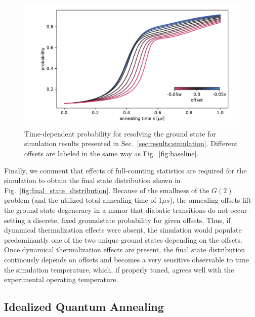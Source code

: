 \documentclass[10pt]{iopart}
\begin{document}
\begin{figure}
	\centering
	\includegraphics[width=\columnwidth]{./new_figures/time_dependent_probability.pdf}
	\caption{Time-dependent probability for resolving the ground state for simulation results presented in Sec.~\ref{sec:results:simulation}. Different offsets are labeled in the same way as Fig.~\ref{fig:baseline}.}
	\label{fig:td_prob}
\end{figure}

Finally, we comment that effects of full-counting statistics are required for the simulation to obtain the final state distribution shown in Fig.~\ref{fig:final_state_distribution}.
Because of the smallness of the $G(2)$ problem (and the utilized total annealing time of 1$\mu s$), the annealing offsets lift the ground state degeneracy in a manor that diabatic transitions do not occur--setting a discrete, fixed groundstate probability for given offsets.
Thus, if dynamical thermalization effects were absent, the simulation would populate predominantly one of the two unique ground states depending on the offsets.
Once dynamical thermalization effects are present, the final state distribution  continously depends on offsets and becomes a very sensitive observable to tune the simulation temperature, which, if properly tuned, agrees well with the experimental operating temperature.


\subsection{Idealized Quantum Annealing}
\label{sec:discussion:idealqa}
\end{document}
